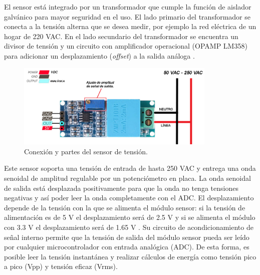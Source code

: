El sensor está integrado por un transformador que cumple la función de aislador galvánico para mayor seguridad en el uso. El lado primario del transformador se conecta a la tensión alterna que se desea medir, por ejemplo la red eléctrica de un hogar de 220 VAC. En el lado secundario del transformador se encuentra un divisor de tensión y un circuito con amplificador operacional (OPAMP LM358) para adicionar un desplazamiento (\emph{offset}) a la salida análoga \citep{WEBSITE:22}. 

\begin{figure}[htpb]
\centering 
\includegraphics[width=0.85\textwidth]{./Figures/sensortension.png}
\caption{Conexión y partes del sensor de tensión.}
\label{fig:sensortension}
\end{figure}


Este sensor soporta una tensión de entrada de hasta 250 VAC y entrega una onda senoidal de amplitud regulable por un potenciómetro en placa. La onda senoidal de salida está desplazada positivamente para que la onda no tenga tensiones negativas y así poder leer la onda completamente con el ADC. El desplazamiento depende de la tensión con la que se alimenta el módulo sensor: si la tensión de alimentación es de 5 V el desplazamiento será de 2.5 V y si se alimenta el módulo con 3.3 V el desplazamiento será de 1.65 V \citep{WEBSITE:23}. Su circuito de acondicionamiento de señal interno permite que la tensión de salida del módulo sensor pueda ser leído por cualquier microcontrolador con entrada analógica (ADC). De esta forma, es posible leer la tensión instantánea y realizar cálculos de energía como tensión pico a pico (Vpp) y tensión eficaz (Vrms). 




